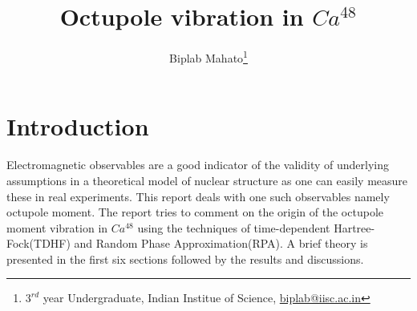 \documentclass[a4paper]{paper}
\title{Octupole vibration in $Ca^{48}$}
\author{Biplab Mahato\thanks{$3^{rd}$ year Undergraduate, Indian Institue of Science, \href{mailto:biplab@iisc.ac.in}{biplab@iisc.ac.in}}}
\begin{document}
        
        \maketitle
        \tableofcontents

        \section{Introduction}
            Electromagnetic observables are a good indicator of the validity of underlying assumptions in a theoretical model of nuclear structure as one can easily measure these in real experiments. This report deals with one such observables namely octupole moment. The report tries to comment on the origin of the octupole moment vibration in $Ca^{48}$ using the techniques of time-dependent Hartree-Fock(TDHF) and Random Phase Approximation(RPA). A brief theory is presented in the first six sections followed by the results and discussions.
            
\end{document}
